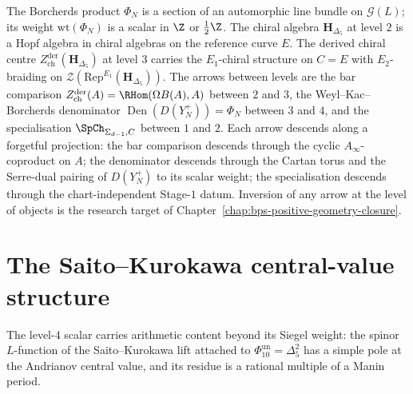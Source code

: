\begin{remark}
\label{rem:terminus-source-target}
The Borcherds product $\Phi_N$ is a section of an automorphic line
bundle on $\mathcal G(L)$; its weight $\mathrm{wt}(\Phi_N)$ is a
scalar in $\Z$ or $\tfrac12\Z$.  The chiral algebra $\mathbf
H_{\Delta_5}$ at level $2$ is a Hopf algebra in chiral algebras on
the reference curve $E$.  The derived chiral centre
$Z^{\mathrm{der}}_{\mathrm{ch}}(\mathbf H_{\Delta_5})$ at level $3$
carries the $E_1$-chiral structure on $C = E$ with $E_2$-braiding
on $\mathcal Z(\mathrm{Rep}^{E_1}(\mathbf H_{\Delta_5}))$.  The
arrows between levels are the bar comparison
$Z^{\mathrm{der}}_{\mathrm{ch}}(A) = \RHom(\Omega B(A), A)$
between $2$ and $3$, the Weyl--Kac--Borcherds denominator
$\operatorname{Den}(D(Y^+_N)) = \Phi_N$ between $3$ and $4$, and the
specialisation $\SpCh_{\Sigma_{d-1}, C}$ between $1$ and $2$.  Each arrow descends along a forgetful projection: the bar
comparison descends through the cyclic $A_\infty$-coproduct on $A$;
the denominator descends through the Cartan torus and the Serre-dual
pairing of $D(Y^+_N)$ to its scalar weight; the specialisation
descends through the chart-independent Stage-$1$ datum. Inversion of
any arrow at the level of objects is the research target of
Chapter~\ref{chap:bps-positive-geometry-closure}.
\end{remark}

\section{The Saito--Kurokawa central-value structure}
\label{sec:terminus-saito-kurokawa}

The level-$4$ scalar carries arithmetic content beyond its Siegel
weight: the spinor $L$-function of the Saito--Kurokawa lift attached
to $\Phi_{10}^{\mathrm{un}} = \Delta_5^2$ has a simple pole at the
Andrianov central value, and its residue is a rational multiple of
a Manin period.

